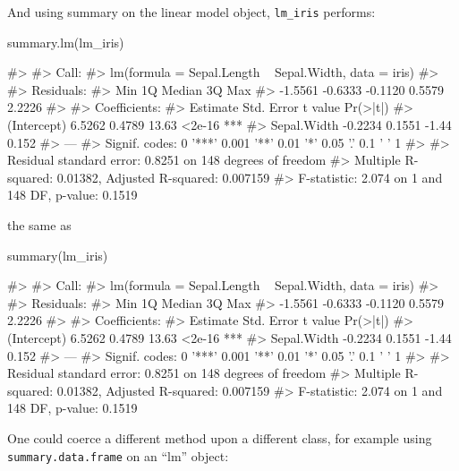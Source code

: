 And using summary on the linear model object, \texttt{lm\_iris}
performs:

\begin{Schunk}
\begin{Sinput}
summary.lm(lm_iris)
\end{Sinput}
\begin{Soutput}
#> 
#> Call:
#> lm(formula = Sepal.Length ~ Sepal.Width, data = iris)
#> 
#> Residuals:
#>     Min      1Q  Median      3Q     Max 
#> -1.5561 -0.6333 -0.1120  0.5579  2.2226 
#> 
#> Coefficients:
#>             Estimate Std. Error t value Pr(>|t|)    
#> (Intercept)   6.5262     0.4789   13.63   <2e-16 ***
#> Sepal.Width  -0.2234     0.1551   -1.44    0.152    
#> ---
#> Signif. codes:  0 '***' 0.001 '**' 0.01 '*' 0.05 '.' 0.1 ' ' 1
#> 
#> Residual standard error: 0.8251 on 148 degrees of freedom
#> Multiple R-squared:  0.01382,    Adjusted R-squared:  0.007159 
#> F-statistic: 2.074 on 1 and 148 DF,  p-value: 0.1519
\end{Soutput}
\end{Schunk}

the same as

\begin{Schunk}
\begin{Sinput}
summary(lm_iris)
\end{Sinput}
\begin{Soutput}
#> 
#> Call:
#> lm(formula = Sepal.Length ~ Sepal.Width, data = iris)
#> 
#> Residuals:
#>     Min      1Q  Median      3Q     Max 
#> -1.5561 -0.6333 -0.1120  0.5579  2.2226 
#> 
#> Coefficients:
#>             Estimate Std. Error t value Pr(>|t|)    
#> (Intercept)   6.5262     0.4789   13.63   <2e-16 ***
#> Sepal.Width  -0.2234     0.1551   -1.44    0.152    
#> ---
#> Signif. codes:  0 '***' 0.001 '**' 0.01 '*' 0.05 '.' 0.1 ' ' 1
#> 
#> Residual standard error: 0.8251 on 148 degrees of freedom
#> Multiple R-squared:  0.01382,    Adjusted R-squared:  0.007159 
#> F-statistic: 2.074 on 1 and 148 DF,  p-value: 0.1519
\end{Soutput}
\end{Schunk}

One could coerce a different method upon a different class, for example
using \texttt{summary.data.frame} on an ``lm'' object:

